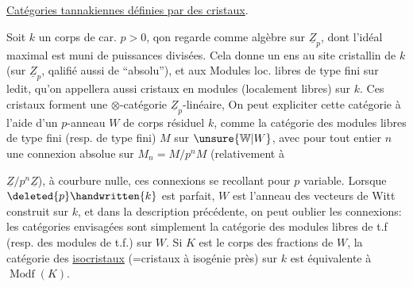 \uline{Catégories tannakiennes définies par des cristaux}.

 Soit $k$ un corps de car. $p>0$, qon regarde comme algèbre sur $\underline{Z}_p$, dont l'idéal maximal est muni de puissances divisées. Cela donne un ens au site cristallin de $k$ (sur $\underline{Z}_p$, qalifié aussi de ``absolu''), et aux Modules loc. libres de type fini sur ledit, qu'on appellera aussi cristaux en modules (localement libres) sur $k$. Ces cristaux forment une $\otimes$-catégorie $\underline{Z}_p$-linéaire,  On peut expliciter cette catégorie à l'aide d'un $p$-anneau $W$ de corps résiduel $k$, comme la catégorie des modules libres de type fini (resp. de type fini) $M$ sur $\unsure{\mathbb{W}|W}$, avec pour tout entier $n$ une connexion absolue sur $M_n=M/p^nM$ (relativement à  $\underline{Z}/p^n\underline{Z}$), à courbure nulle, ces connexions se recollant pour $p$ variable. Lorsque $\deleted{p}\handwritten{k}$ est parfait, $W$ est l'anneau des vecteurs de Witt construit sur $k$, et dans la description précédente, on peut oublier les connexions: les catégories envisagées sont simplement la catégorie des modules libres de t.f (resp. des modules de t.f.) sur $W$. Si $K$ est le corps des fractions de $W$, la catégorie des \uline{isocristaux}  (=cristaux à isogénie près) sur $k$ est équivalente à $\operatorname{Modf}(K)$. 

